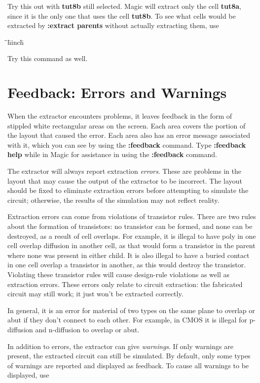\documentclass[letterpaper,twoside,12pt]{article}
\def\hinch{\hspace*{0.5in}}
\def\starti{\begin{center}\begin{tabbing}\hinch\=\hinch\=\hinch\=hinch\hinch\=\kill}
\def\endi{\end{tabbing}\end{center}}
\def\ii{\>\>\>}
\begin{document}
Try this out with {\bfseries tut8b} still selected.  Magic will extract
only the cell {\bfseries tut8a}, since it is the only one that uses the
cell {\bfseries tut8b}.
To see what cells would be extracted by {\bfseries :extract parents}
without actually extracting them, use

\starti
   \ii {\bfseries :extract showparents}
\endi

Try this command as well.

\section{Feedback: Errors and Warnings}

When the extractor encounters problems, it leaves feedback in the form
of stippled white rectangular areas on the screen.
Each area covers the portion of the layout that caused the error.
Each area also has an error message associated with it, which you can see
by using the {\bfseries :feedback} command.
Type {\bfseries :feedback help} while
in Magic for assistance in using the {\bfseries :feedback} command.

The extractor will always report extraction {\itshape errors}.
These are problems in
the layout that may cause the output of the extractor to be incorrect.
The layout should be fixed to eliminate extraction errors
before attempting to simulate the circuit; otherwise, the
results of the simulation may not reflect reality.

Extraction errors can come from violations of transistor rules.
There are two rules about the formation of transistors:
no transistor can be formed, and none can be destroyed,
as a result of cell overlaps.
For example, it
is illegal to have poly in one cell overlap diffusion in another cell,
as that would form a transistor in the parent where none was present
in either child.  It is also illegal to have a buried contact in one
cell overlap a transistor in another, as this would destroy the transistor.
Violating these transistor rules will cause design-rule violations
as well as extraction errors.
These errors only relate to circuit extraction: the fabricated
circuit may still work; it just won't be extracted correctly.

In general, it is an error for material of two types on the same plane
to overlap or abut if they don't connect to each other.  For example,
in CMOS it is illegal for p-diffusion and n-diffusion to overlap or abut.

In addition to errors, the extractor can give {\itshape warnings}.
If only warnings are present, the extracted circuit can still be
simulated.
By default, only some types of warnings are reported and displayed as feedback.
To cause all warnings to be displayed, use
\end{document}

